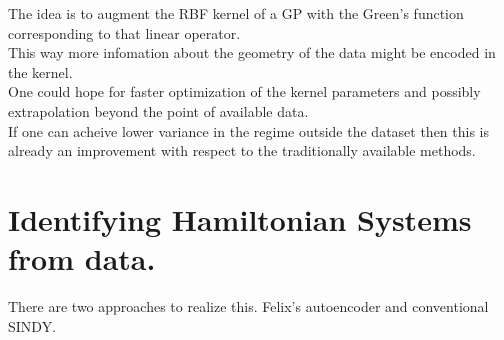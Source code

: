 \documentclass{article}
\begin{document}
The idea is to augment the RBF kernel of a GP with the Green's function corresponding to that linear operator. \\ 
This way more infomation about the geometry of the data might be encoded in the kernel. \\  

One could hope for faster optimization of the kernel parameters and possibly extrapolation beyond the point of available data. \\ 
If one can acheive lower variance in the regime outside the dataset then this is already an improvement with respect to the traditionally available methods. \\

\section{Identifying Hamiltonian Systems from data.}
There are two approaches to realize this. Felix's autoencoder and conventional SINDY. 
\end{document}
